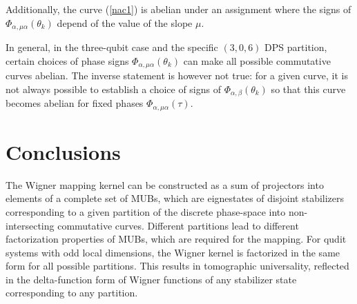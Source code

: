 \documentclass[quantumrep,article,submit,pdftex,moreauthors]{Definitions/mdpi}
\begin{document}
Additionally, the curve (\ref{nac1}) is abelian under an assignment where the
signs of $\Phi_{\alpha,\mu \alpha}(\theta_{k})$ depend of the value of the slope
$\mu$.

In general, in the three-qubit case and the specific $(3,0,6)$ DPS partition,
certain choices of phase signs $\Phi_{\alpha,\mu \alpha}(\theta_{k})$ can make
all possible commutative curves abelian. The inverse statement is however not
true: for a given curve, it is not always possible to establish a choice of
signs of $\Phi_{\alpha,\beta }(\theta_{k})$ so that this curve becomes abelian
for fixed phases $\Phi_{\alpha,\mu \alpha}(\tau)$.

\section{Conclusions}

The Wigner mapping kernel can be constructed as a sum of projectors into
elements of a complete set of MUBs, which are eignestates of disjoint
stabilizers corresponding to a given partition of the discrete phase-space
into non-intersecting commutative curves. Different partitions lead to
different factorization properties of MUBs, which are required for the
mapping. For qudit systems with odd local dimensions, the Wigner kernel is
factorized in the same form for all possible partitions. This results in
tomographic universality, reflected in the delta-function form of Wigner
functions of any stabilizer state corresponding to any partition.
\end{document}

